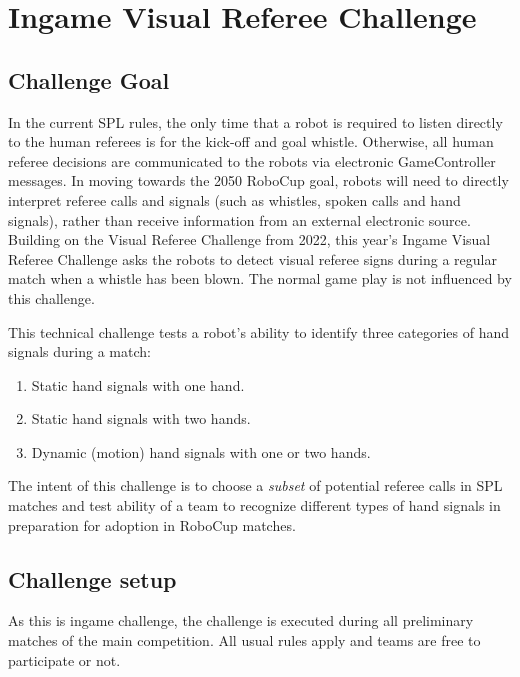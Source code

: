 \section{Ingame Visual Referee Challenge}

\subsection{Challenge Goal}

In the current SPL rules, the only time that a robot is required to listen directly to the human referees is for the kick-off and goal whistle. Otherwise, all human referee decisions are communicated to the robots via electronic GameController messages. In moving towards the 2050 RoboCup goal, robots will need to directly interpret referee calls and signals (such as whistles, spoken calls and hand signals), rather than receive information from an external electronic source.
Building on the Visual Referee Challenge from 2022, this year's Ingame Visual Referee Challenge asks the robots to detect visual referee signs during a regular match when a whistle has been blown. The normal game play is not influenced by this challenge.

This technical challenge tests a robot's ability to identify three categories of hand signals during a match:
\begin{enumerate}
    \item Static hand signals with one hand.
    \item Static hand signals with two hands.
    \item Dynamic (motion) hand signals with one or two hands.
\end{enumerate}

The intent of this challenge is to choose a \emph{subset} of potential referee calls in SPL matches and test ability of a team to recognize different types of hand signals in preparation for adoption in RoboCup matches.

\subsection{Challenge setup}

As this is ingame challenge, the challenge is executed during all preliminary matches of the main competition. All usual rules apply and teams are free to participate or not.


